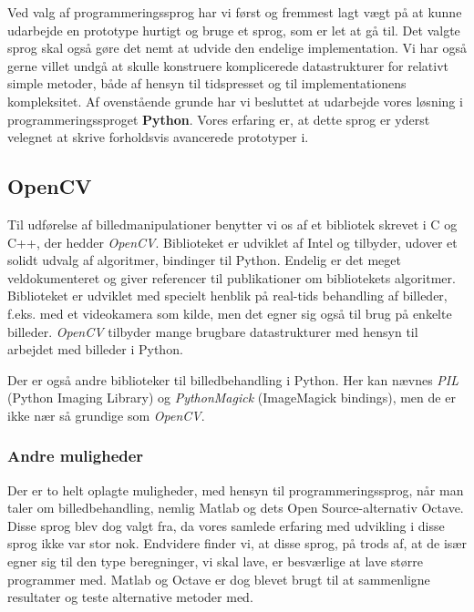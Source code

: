 {
{\sffamily Ved valg af programmeringssprog har vi først og fremmest lagt
vægt på at kunne udarbejde en prototype hurtigt og bruge et sprog, som
er let at gå til. Det valgte sprog skal også gøre det nemt at udvide den
endelige implementation. Vi har også gerne villet undgå at skulle
konstruere komplicerede datastrukturer for relativt simple metoder, både
af hensyn til tidspresset og til implementationens kompleksitet. Af
ovenstående grunde har vi besluttet at udarbejde vores løsning i
programmeringssproget \textbf{Python}\cite{PythonLanguage}. Vores
erfaring er, at dette sprog er yderst velegnet at skrive forholdsvis
avancerede prototyper i.
}

\subsection{OpenCV}
Til udførelse af billedmanipulationer benytter vi os af et bibliotek
skrevet i C og C++, der hedder \emph{OpenCV}\cite{OpenCV}. Biblioteket
er udviklet af Intel og tilbyder, udover et solidt udvalg af algoritmer,
bindinger til Python\cite{OpenCVPython}. Endelig er det meget
veldokumenteret og giver referencer til publikationer om bibliotekets
algoritmer. Biblioteket er udviklet med specielt henblik på real-tids
behandling af billeder, f.eks. med et videokamera som kilde, men det
egner sig også til brug på enkelte billeder.  \emph{OpenCV} tilbyder
mange brugbare datastrukturer med hensyn til arbejdet med billeder i
Python.

Der er også andre biblioteker til billedbehandling i Python. Her kan
nævnes \emph{PIL} (Python Imaging Library)\cite{PIL} og
\emph{PythonMagick} (ImageMagick bindings)\cite{PMck}, men de er ikke
nær så grundige som \emph{OpenCV}.

\subsubsection{Andre muligheder}
Der er to helt oplagte muligheder, med hensyn til programmeringssprog,
når man taler om billedbehandling, nemlig Matlab\cite{MatlabLang} og
dets Open Source-alternativ Octave\cite{Octave}. Disse sprog blev dog
valgt fra, da vores samlede erfaring med udvikling i disse sprog ikke
var stor nok.  Endvidere finder vi, at disse sprog, på trods af, at de
især egner sig til den type beregninger, vi skal lave, er besværlige at
lave større programmer med. Matlab og Octave er dog blevet brugt til at
sammenligne resultater og teste alternative metoder med.

}
